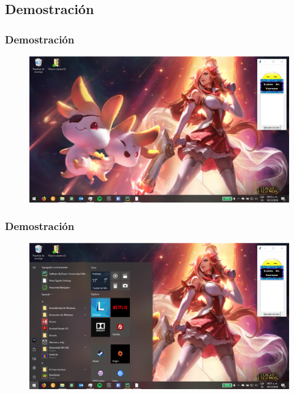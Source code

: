 \subsection{Demostraci\'on}

\begin{frame}
\frametitle{Demostraci\'on}
\begin{figure}[H]
\centering
\includegraphics[width=1.0\columnwidth]{Imagenes/0.eps}
\end{figure}
\end{frame}

\begin{frame}
\frametitle{Demostraci\'on}
\begin{figure}[H]
\centering
\includegraphics[width=1.0\columnwidth]{Imagenes/1.eps}
\end{figure}
\end{frame}

